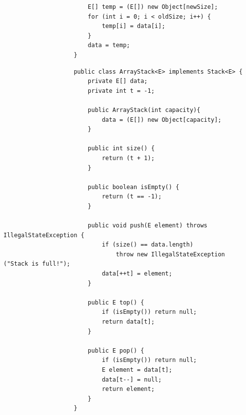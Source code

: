 \documentclass[a4paper, landscape, 8pt]{scrartcl}
\begin{document}
\begin{multicols*}{4}
\begin{lstlisting}
                        E[] temp = (E[]) new Object[newSize];
                        for (int i = 0; i < oldSize; i++) {
                            temp[i] = data[i];
                        }
                        data = temp;
                    }
            \end{lstlisting}
            \begin{lstlisting}
                    public class ArrayStack<E> implements Stack<E> {
                        private E[] data;
                        private int t = -1;

                        public ArrayStack(int capacity){
                            data = (E[]) new Object[capacity];
                        }

                        public int size() {
                            return (t + 1);
                        }

                        public boolean isEmpty() {
                            return (t == -1);
                        }

                        public void push(E element) throws IllegalStateException {
                            if (size() == data.length)
                                throw new IllegalStateException ("Stack is full!");
                            data[++t] = element;
                        }

                        public E top() {
                            if (isEmpty()) return null;
                            return data[t];
                        }

                        public E pop() {
                            if (isEmpty()) return null;
                            E element = data[t];
                            data[t--] = null;
                            return element;
                        }
                    }
            \end{lstlisting}


\end{multicols*}
\end{document}

